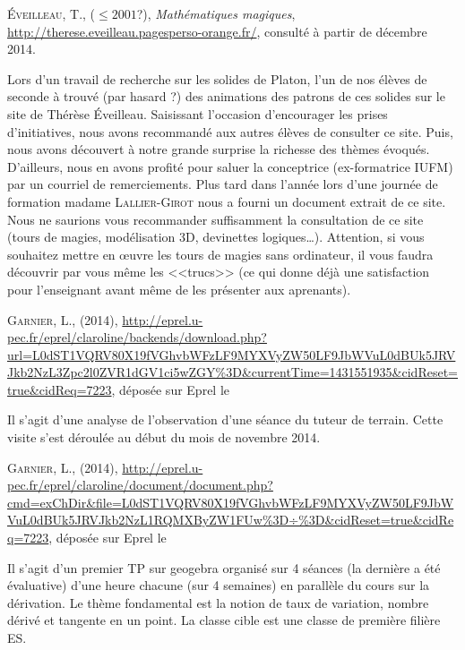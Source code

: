 \begin{thebibliography}{99}
  \textsc{\'Eveilleau}, T., ($\leqslant 2001$?),
  \textit{Mathématiques magiques},
  \url{http://therese.eveilleau.pagesperso-orange.fr/}, consulté à
  partir de décembre 2014.

  Lors d'un travail de recherche sur les solides de Platon, l'un de
  nos élèves de seconde à trouvé (par hasard ?) des animations des
  patrons de ces solides sur le site de Thérèse
  \'Eveilleau. Saisissant l'occasion d'encourager les prises
  d'initiatives, nous avons recommandé aux autres élèves de consulter ce
  site. Puis, nous avons découvert à notre grande surprise la richesse des
  thèmes évoqués. D'ailleurs, nous en avons profité pour saluer la
  conceptrice (ex-formatrice IUFM) par un courriel de
  remerciements. Plus tard dans l'année lors d'une journée de
  formation madame \textsc{Lallier-Girot} nous a fourni un document
  extrait de ce site. Nous ne saurions vous recommander suffisamment
  la consultation de ce site (tours de magies, modélisation 3D,
  devinettes logiques\dots). Attention, si vous souhaitez mettre en
  \oe{}uvre les tours de magies sans ordinateur, il vous faudra
  découvrir par vous même les <<trucs>> (ce qui donne déjà une
  satisfaction pour l'enseignant avant même de les présenter aux aprenants).

  \textsc{Garnier}, L., (2014),
  \url{http://eprel.u-pec.fr/eprel/claroline/backends/download.php?url=L0dST1VQRV80X19fVGhvbWFzLF9MYXVyZW50LF9JbWVuL0dBUk5JRVJkb2NzL3Zpc2l0ZVR1dGV1ci5wZGY\%3D\&currentTime=1431551935\&cidReset=true\&cidReq=7223},
  déposée sur Eprel le \date{13 mai 2015}

  Il s'agit d'une analyse de l'observation d'une séance du tuteur de
  terrain. Cette visite s'est déroulée au début du mois de novembre 2014.

  \textsc{Garnier}, L., (2014),
  \url{http://eprel.u-pec.fr/eprel/claroline/document/document.php?cmd=exChDir\&file=L0dST1VQRV80X19fVGhvbWFzLF9MYXVyZW50LF9JbWVuL0dBUk5JRVJkb2NzL1RQMXByZW1FUw\%3D÷\%3D\&cidReset=true\&cidReq=7223},
  déposée sur Eprel le \date{13 mai 2015}

  Il s'agit d'un premier TP sur geogebra organisé sur 4 séances (la
  dernière a été évaluative) d'une heure chacune (sur 4 semaines) en
  parallèle du cours sur la dérivation. Le thème fondamental est la
  notion de taux de variation, nombre dérivé et tangente en un
  point. La classe cible est une classe de première filière ES.


\end{thebibliography}

